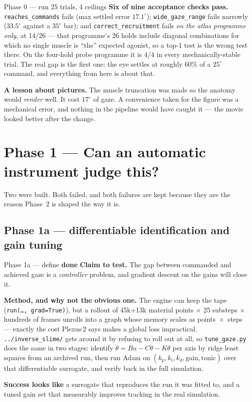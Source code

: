 \documentclass[11pt,a4paper]{article}
\newcommand{\code}[1]{\texttt{#1}}
\newcommand{\dn}{\textcolor{good}{\textbf{done}}}
\begin{document}
\begin{runbox}{Phase 0 --- run \hfill 25 trials, 4 ceilings}
\textbf{Six of nine acceptance checks pass.} \code{reaches\_commands} fails (max settled error
$17.1^\circ$); \code{wide\_gaze\_range} fails narrowly ($33.5^\circ$ against a $35^\circ$ bar); and
\code{correct\_recruitment} fails \emph{on the atlas programme only}, at 14/26 --- that programme's
26 holds include diagonal combinations for which no single muscle is ``the'' expected agonist, so a
top-1 test is the wrong test there. On the four-hold probe programme it is 4/4 in every
mechanically-stable trial. The real gap is the first one: the eye settles at roughly 60\% of a
$25^\circ$ command, and everything from here is about that.
\end{runbox}

\textbf{A lesson about pictures.} The muscle truncation was made so the anatomy would \emph{render}
well. It cost $17^\circ$ of gaze. A convenience taken for the figure was a mechanical error, and
nothing in the pipeline would have caught it --- the movie looked better after the change.

\section{Phase 1 --- Can an automatic instrument judge this?}

Two were built. Both failed, and both failures are kept because they are the reason Phase~2 is
shaped the way it is.

\subsection{Phase 1a --- differentiable identification and gain tuning}

\begin{phasebox}{Phase 1a --- define \hfill \dn}
\textbf{Claim to test.} The gap between commanded and achieved gaze is a \emph{controller} problem,
and gradient descent on the gains will close it.

\textbf{Method, and why not the obvious one.} The engine can keep the tape
(\code{run(\ldots, grad=True)}), but a rollout of 45k$+$13k material points $\times$ 25 substeps
$\times$ hundreds of frames unrolls into a graph whose memory scales as points~$\times$~steps ---
exactly the cost Plexus\,2 says makes a global loss impractical. \code{../inverse\_slime/} gets
around it by refusing to roll out at all, so \code{tune\_gaze.py} does the same in two stages:
identify $\ddot\theta = Bu - C\dot\theta - K\theta$ per axis by ridge least squares from an archived
run, then run Adam on $(k_p,k_i,k_d,\text{gain},\text{tonic})$ over that differentiable surrogate,
and verify back in the full simulation.

\textbf{Success looks like} a surrogate that reproduces the run it was fitted to, and a tuned gain
set that measurably improves tracking in the real simulation.
\end{phasebox}
\end{document}
